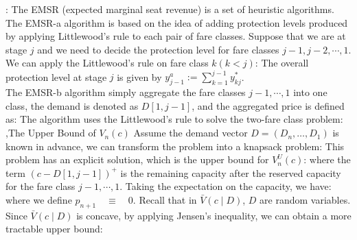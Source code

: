 \documentclass[10pt]{report}
\begin{document}
: The EMSR (expected marginal seat revenue) is a set of heuristic algorithms. The EMSR-a algorithm is based on the idea of
adding protection levels produced by applying Littlewood’s rule to each pair of fare classes. Suppose that we are at stage $j$ and we need to decide the
protection level for fare classes $j-1,j-2,\cdots,1$. We can apply the Littlewood's rule on fare class $k(k<j)$:
The overall protection level at stage $j$ is given by $y_{j-1}^a:=\sum_{k=1}^{j-1}y_{kj}^*$.\\
The EMSR-b algorithm simply aggregate the fare classes $j-1,\cdots,1$ into one class, the demand is denoted as $D[1,j-1]$, and the aggregated price is defined as:
The algorithm uses the Littlewood's rule to solve the two-fare class problem:
\sep{The Upper Bound of $V_n(c)$}
Assume the demand vector $D=(D_{n},\ldots, D_{1})$ is known in advance, we can transform the problem into a knapsack problem:
This problem has an explicit solution, which is the upper bound for $V^U_n(c)$:
where the term $(c-D[1,j-1])^+$ is the remaining capacity after the reserved capacity for the fare class $j-1,\cdots,1$. Taking the expectation on the capacity, we have:
where we define $p_{n+1}\quad\equiv\quad0$. Recall that in $\bar{V}(c\mid D)$, $D$ are random variables. Since $\bar{V}(c\mid D)$ is concave, by applying Jensen's inequality, we can obtain a more tractable upper bound:
\end{document}
